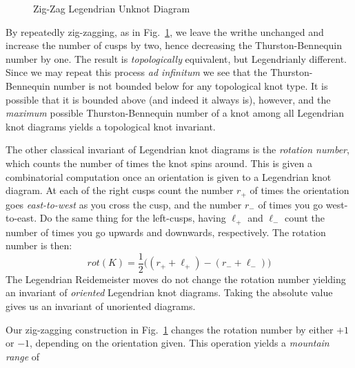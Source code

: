     \par\hfill\par
    \begin{figure}
        \centering
        \caption{Zig-Zag Legendrian Unknot Diagram}
        \label{fig:legendrian_unknot_zig_zag_001}
    \end{figure}
    By repeatedly zig-zagging, as in
    Fig.~\ref{fig:legendrian_unknot_zig_zag_001}, we leave the writhe unchanged
    and increase the number of cusps by two, hence decreasing the
    Thurston-Bennequin number by one. The result is \textit{topologically}
    equivalent, but Legendrianly different. Since we may repeat this process
    \textit{ad infinitum} we see that the Thurston-Bennequin number is not
    bounded below for any topological knot type. It is possible that it is
    bounded above (and indeed it always is),
    however, and the \textit{maximum} possible
    Thurston-Bennequin number of a knot among all Legendrian knot diagrams
    yields a topological knot invariant.
    \par\hfill\par
    The other classical invariant of Legendrian knot diagrams is the
    \textit{rotation number}, which counts the number of times the knot spins
    around. This is given a combinatorial computation once an orientation is
    given to a Legendrian knot diagram. At each of the right cusps count the
    number $r_{+}$ of times the orientation goes \textit{east-to-west} as you
    cross the cusp, and the number $r_{-}$ of times you go west-to-east.
    Do the same thing for the left-cusps, having $\ell_{+}$ and $\ell_{-}$
    count the number of times you go upwards and downwards, respectively.
    The rotation number is then:
    \begin{equation}
        rot(K)=\frac{1}{2}\big((r_{+}+\ell_{+})-(r_{-}+\ell_{-})\big)
    \end{equation}
    The Legendrian Reidemeister moves do not change the rotation number yielding
    an invariant of \textit{oriented} Legendrian knot diagrams. Taking the
    absolute value gives us an invariant of unoriented diagrams.
    \par\hfill\par
    Our zig-zagging construction in Fig.~\ref{fig:legendrian_unknot_zig_zag_001}
    changes the rotation number by either $+1$ or $-1$, depending on the
    orientation given. This operation yields a \textit{mountain range} of
